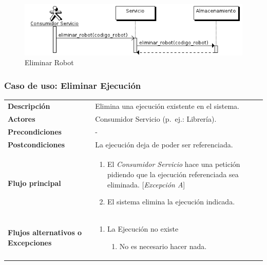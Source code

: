 \begin{figure}[bp!]
  \includegraphics[width=1\textwidth]{chapters/technical-manual/diagrams/sequence/eliminar_robot.png}
\caption{Eliminar Robot}
\end{figure}
\clearpage
\subsubsection{\large{Caso de uso: Eliminar Ejecución}}

\begin{tabular}[h]{ p{ } p{ }}

\textbf{Descripción} &  Elimina una ejecución existente en el sistema. \\[3mm]

\textbf{Actores} & Consumidor Servicio (p.~ej.: Librería).\\[3mm]

\textbf{Precondiciones} & - \\[3mm]

\textbf{Postcondiciones} & La ejecución deja de poder ser referenciada. \\[3mm]

\textbf{Flujo principal} & \begin{enumerate}[leftmargin=1em,topsep=0pt, partopsep=0pt]
  \item El \emph{Consumidor Servicio} hace una petición pidiendo que
    la ejecución referenciada sea eliminada. [\emph{Excepción A}]
  \item El sistema elimina la ejecución indicada.
\end{enumerate}\\[3mm]

\textbf{Flujos alternativos o Excepciones} &
\begin{enumerate}[label=\Alph*:,leftmargin=1em,topsep=0pt, partopsep=0pt]
\item La Ejecución no existe
  \begin{enumerate}[label=\arabic*.,topsep=0pt, partopsep=0pt]
    \item No es necesario hacer nada.
  \end{enumerate}
\end{enumerate}\\[3mm]
\end{tabular}

